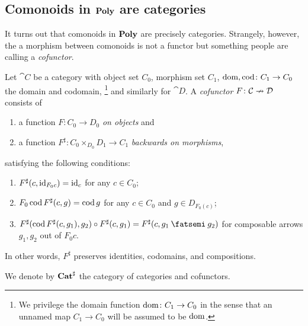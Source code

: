 \documentclass[DynamicalBook]{subfiles}
\begin{document}
\subsection{Comonoids in $\textbf{Poly}$ are categories}

It turns out that comonoids in $\textbf{Poly}$ are precisely categories. Strangely, however, the a morphism between comonoids is not a functor but something people are calling a \emph{cofunctor}.

\begin{definition}[Cofunctor]\label{def.cofunctor}
Let $\cat{C}$ be a category with object set $C_0$, morphism set $C_1$, $\operatorname{dom},\operatorname{cod}\colon C_1\to C_0$ the domain and codomain,%
\footnote{We privilege the domain function $\operatorname{dom}\colon C_1\to C_0$ in the sense that an unnamed map $C_1\to C_0$ will be assumed to be $\operatorname{dom}$.}
 and similarly for $\cat{D}$. A \emph{cofunctor} $F\colon \mathcal{C}\nrightarrow \mathcal{D}$ consists of
\begin{enumerate}[itemsep=0pt]
  \item a function  $F\colon C_0\to D_0$ \emph{on objects} and
  \item a function $F^\sharp\colon C_0\times_{D_0}D_1\to C_1$ \emph{backwards on morphisms},
\end{enumerate}
satisfying the following conditions:
\begin{enumerate}[itemsep=0pt, label=\roman*.]
	\item $F^\sharp(c,\mathrm{id}_{F_0c})=\mathrm{id}_c$ for any $c\in C_0$;
	\item $F_0\operatorname{cod} F^\sharp(c,g)=\operatorname{cod} g$ for any $c\in C_0$ and $g\in D_{F_0(c)}$;
	\item $F^\sharp(\cod F^\sharp(c,g_1),g_2)\circ F^\sharp(c,g_1)=F^\sharp(c,g_1\then g_2)$ for composable arrows $g_1,g_2$ out of $F_0 c$.
\end{enumerate}
In other words, $F^\sharp$ preserves identities, codomains, and compositions.

We denote by $\textbf{Cat}^\sharp$ the category of categories and cofunctors.
\end{definition}
\end{document}

